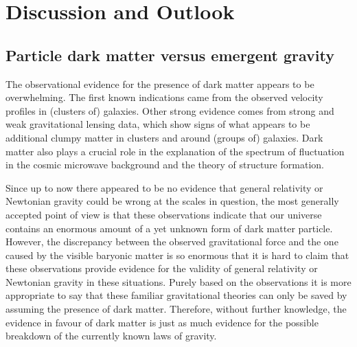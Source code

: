 \documentclass[a4paper,12pt]{article}
\begin{document}




 



\vspace{1cm}


\section{Discussion and Outlook}
\setcounter{equation}{0}


\subsection{Particle dark matter versus emergent gravity}

The observational evidence for the presence of dark matter appears to be overwhelming. 
The first known indications came from the observed velocity profiles in (clusters of) galaxies.  Other strong evidence comes from strong and weak gravitational lensing data, which show signs of what appears to be additional clumpy matter in clusters and around (groups of) galaxies. Dark matter also 
plays a crucial role in the explanation of the spectrum of fluctuation in the cosmic microwave background and the theory of structure formation. 

Since up to now there appeared to be no evidence that general relativity or Newtonian gravity could be wrong at the scales in question, the most generally accepted point of view is that these observations 
indicate that our universe contains an enormous amount of a yet unknown form of dark matter particle. However, the discrepancy between the observed  
gravitational force and the one caused by the visible baryonic matter  is so enormous 
that it is hard to claim that these observations provide evidence for the validity of general relativity or Newtonian gravity in these situations. Purely based on the observations it is more appropriate to say that these familiar gravitational theories can only be saved by assuming the presence of dark matter. Therefore, without further knowledge, the evidence in favour of dark matter is just as much evidence for the possible breakdown of the currently known laws of gravity. 
\end{document}
